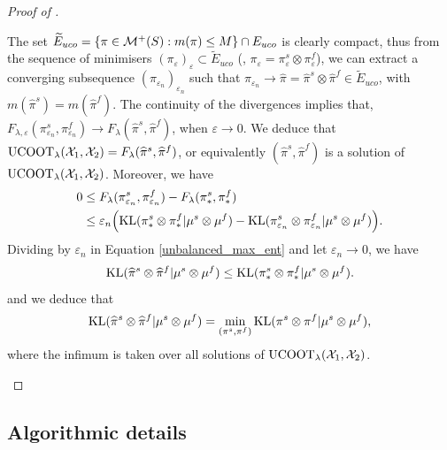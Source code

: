 \begin{proof}[Proof of ]
\begin{enumerate}
    The set $\widetilde{E}_{uco} = \{\pi \in \mathcal M^+(S): m(\pi) \leq M\} \cap E_{uco}$
    is clearly compact, thus from the sequence of minimisers
    $(\pi_{\varepsilon})_{\varepsilon} \subset \widetilde{E}_{uco}$
    (\ie, $\pi_{\varepsilon} = \pi_{\varepsilon}^s \otimes \pi_{\varepsilon}^f$), we can extract a
    converging subsequence $(\pi_{\varepsilon_n})_{\varepsilon_n}$ such that
    $\pi_{\varepsilon_n} \to \widehat{\pi} = \widehat{\pi}^s \otimes \widehat{\pi}^f \in \widetilde{E}_{uco}$,
    with $m(\widehat{\pi}^s) = m(\widehat{\pi}^f)$.
    The continuity of the divergences implies that,
    $F_{\lambda, \varepsilon}(\pi_{\varepsilon_n}^s, \pi_{\varepsilon_n}^f) \to
    F_{\lambda}(\widehat{\pi}^s, \widehat{\pi}^f)$, when $\varepsilon \to 0$. We deduce that
    $\text{UCOOT}_{\lambda}(\mathcal X_1, \mathcal X_2) = F_{\lambda}(\widehat{\pi}^s, \widehat{\pi}^f)$,
    or equivalently $(\widehat{\pi}^s, \widehat{\pi}^f)$
    is a solution of $\text{UCOOT}_{\lambda}(\mathcal X_1, \mathcal X_2)$. Moreover, we have
    \begin{equation} \label{unbalanced_max_ent}
      \begin{split}
        0 &\leq F_{\lambda}(\pi_{\varepsilon_n}^s, \pi_{\varepsilon_n}^f)
        - F_{\lambda}(\pi_*^s, \pi_*^f) \\
      &\leq \varepsilon_n \Big( \text{KL}(\pi_*^s \otimes \pi_*^f \vert \mu^s \otimes \mu^f) -
      \text{KL}(\pi_{\varepsilon_n}^s \otimes \pi_{\varepsilon_n}^f \vert \mu^s \otimes \mu^f) \Big).
      \end{split}
    \end{equation}
    Dividing by $\varepsilon_n$ in Equation \eqref{unbalanced_max_ent} and let
    $\varepsilon_n \to 0$, we have
    \begin{equation}
      \text{KL}(\widehat{\pi}^s \otimes \widehat{\pi}^f \vert \mu^s \otimes \mu^f) \leq
      \text{KL}(\pi_*^s \otimes \pi_*^f \vert \mu^s \otimes \mu^f).
    \end{equation}
    and we deduce that
    \begin{equation}
      \text{KL}(\widehat{\pi}^s \otimes \widehat{\pi}^f \vert \mu^s \otimes \mu^f) =
      \min_{(\pi^s, \pi^f)} \text{KL}(\pi^s \otimes \pi^f \vert \mu^s \otimes \mu^f),
    \end{equation}
    where the infimum is taken over all solutions of $\text{UCOOT}_{\lambda}(\mathcal X_1, \mathcal X_2)$.
  \end{enumerate}
\end{proof}


\subsection{Algorithmic details}

